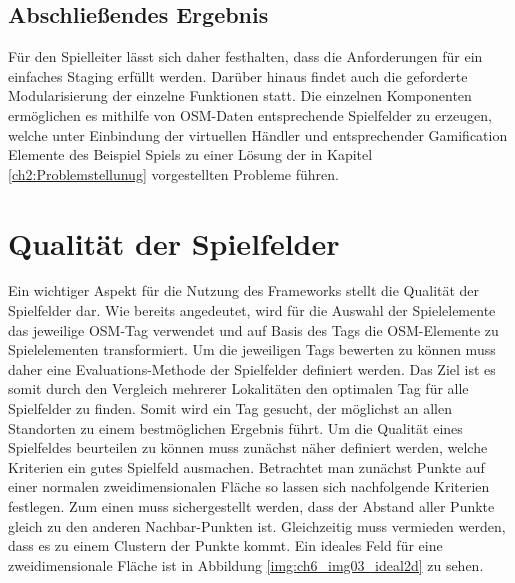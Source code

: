 \subsection*{Abschließendes Ergebnis}

Für den Spielleiter lässt sich daher festhalten, dass die Anforderungen für ein einfaches Staging erfüllt werden. Darüber hinaus findet auch die geforderte Modularisierung der einzelne Funktionen statt. Die einzelnen Komponenten ermöglichen es mithilfe von OSM-Daten entsprechende Spielfelder zu erzeugen, welche unter Einbindung der virtuellen Händler und entsprechender Gamification Elemente des Beispiel Spiels zu einer Lösung der in Kapitel \ref{ch2:Problemstellunug} vorgestellten Probleme führen.


\section{Qualität der Spielfelder}
\label{ch:CH6_qualtiy_of_gameboards}

Ein wichtiger Aspekt für die Nutzung des Frameworks stellt die Qualität der Spielfelder dar.
Wie bereits angedeutet, wird für die Auswahl der Spielelemente das jeweilige OSM-Tag verwendet und auf Basis des Tags die OSM-Elemente zu Spielelementen transformiert. Um die jeweiligen Tags bewerten zu können muss daher eine Evaluations-Methode der Spielfelder definiert werden.
Das Ziel ist es somit durch den Vergleich mehrerer Lokalitäten den optimalen Tag für alle Spielfelder zu finden. Somit wird ein Tag gesucht, der möglichst an allen Standorten zu einem bestmöglichen Ergebnis führt.
Um die Qualität eines Spielfeldes beurteilen zu können muss zunächst näher definiert werden, welche Kriterien ein gutes Spielfeld ausmachen. 
Betrachtet man zunächst Punkte auf einer normalen zweidimensionalen Fläche so lassen sich nachfolgende Kriterien festlegen.
Zum einen muss sichergestellt werden, dass der Abstand aller Punkte gleich zu den anderen Nachbar-Punkten ist. Gleichzeitig muss vermieden werden, dass es zu einem Clustern der Punkte kommt. Ein ideales Feld für eine zweidimensionale Fläche ist in Abbildung \ref{img:ch6_img03_ideal2d} zu sehen.


